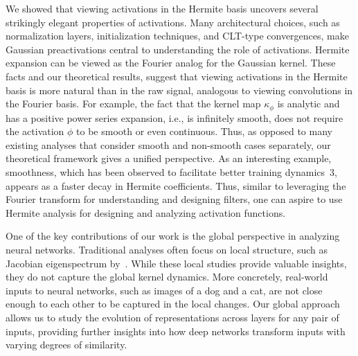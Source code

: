 \documentclass[twoside]{article}
\newcommand{\km}{\kappa_\phi}
\theoremstyle{definition}
\begin{document}
We showed that viewing activations in the Hermite basis uncovers several strikingly elegant properties of activations. Many architectural choices, such as normalization layers, initialization techniques, and CLT-type convergences, make Gaussian preactivations central to understanding the role of activations. Hermite expansion can be viewed as the Fourier analog for the Gaussian kernel. These facts and our theoretical results, suggest that viewing activations in the Hermite basis is more natural than in the raw signal, analogous to viewing convolutions in the Fourier basis. For example, the fact that the kernel map $\km$ is analytic and has a positive power series expansion, i.e., is infinitely smooth, does not require the activation $\phi$ to be smooth or even continuous. Thus, as opposed to many existing analyses that consider smooth and non-smooth cases separately, our theoretical framework gives a unified perspective. As an interesting example, smoothness, which has been observed to facilitate better training dynamics~3\citep{hayou2019impact}, appears as a faster decay in Hermite coefficients. Thus, similar to leveraging the Fourier transform for understanding and designing filters, one can aspire to use Hermite analysis for designing and analyzing activation functions.


One of the key contributions of our work is the global perspective in analyzing neural networks. Traditional analyses often focus on local structure, such as Jacobian eigenspectrum by~\citet{pennington2018emergence}. While these local studies provide valuable insights, they do not capture the global kernel dynamics. More concretely, real-world inputs to neural networks, such as images of a dog and a cat, are not close enough to each other to be captured in the local changes. Our global approach allows us to study the evolution of representations across layers for any pair of inputs, providing further insights into how deep networks transform inputs with varying degrees of similarity.
\end{document}
